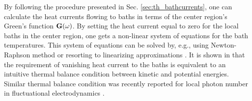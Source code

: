 By following the procedure presented in Sec. \ref{sec:th_bathcurrents}, one can calculate the heat currents flowing to baths in terms of the center region's Green's function $\mathbf{G}(\omega)$. By setting the heat current equal to zero for the local baths in the center region, one gets a non-linear system of equations for the bath temperatures. This system of equations can be solved by, e.g., using Newton-Raphson method \cite{bandyopadhyay11} or resorting to linearizing approximations \cite{segal09}. It is shown in  that the requirement of vanishing heat current to the baths is equivalent to an intuitive thermal balance condition between kinetic and potential energies. Similar thermal balance condition was recently reported for local photon number in fluctuational electrodynamics \cite{partanen14}. %



% 



